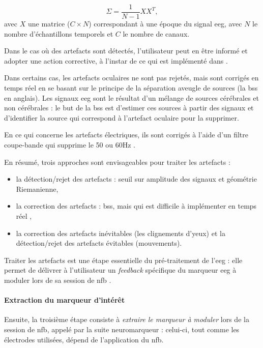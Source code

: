 \begin{equation}
\label{eq:introduction_covariance_matrix}
\Sigma = \frac{1}{N - 1}XX^T,
\end{equation}
avec $X$ une matrice ($C \times N$) correspondant à une époque du signal \gls{eeg}, avec $N$ le nombre d'échantillons temporels et $C$ le nombre de canaux. 

Dans le cas où des artefacts sont détectés, l'utilisateur peut en être informé et adopter une action corrective, à l'instar de ce qui est implémenté dans 
\citet{Bioulac2019}.

Dans certains cas, les artefacts oculaires ne sont pas rejetés, mais sont corrigés en temps réel \citep{Barthelemy2017, Maurizio2014, Bioulac2019} en se basant sur
le principe de la séparation aveugle de sources (la \gls{bss} en anglais). Les signaux \gls{eeg} sont le résultat d'un mélange de sources cérébrales et non cérébrales : le but 
de la \gls{bss} est d'estimer ces sources à partir des signaux et d'identifier la source qui correspond à l'artefact oculaire pour la supprimer.

En ce qui concerne les artefacts électriques, ils sont corrigés à l'aide d'un filtre coupe-bande qui supprime le 50 ou 60Hz \citep{Bioulac2019}.

En résumé, trois approches sont envisageables pour traiter les artefacts :
\begin{itemize}
\item la détection/rejet des artefacts : seuil sur amplitude des signaux et géométrie Riemanienne,
\item la correction des artefacts : \gls{bss}, mais qui est difficile à implémenter en temps réel \citep{Barthelemy2017},
\item la correction des artefacts inévitables (les clignements d'yeux) et la détection/rejet des artefacts évitables (mouvements).
\end{itemize}

Traiter les artefacts est une étape essentielle du pré-traitement de l'\gls{eeg} : elle permet de délivrer à l'utilisateur un \textit{feedback} 
spécifique du marqueur \gls{eeg} à moduler lors de sa session de \gls{nfb} \citep{Barthelemy2019}. 

\paragraph{Extraction du marqueur d'intérêt}
Ensuite, la troisième étape consiste à \emph{extraire le marqueur à moduler} lors de la session de \gls{nfb}, appelé par la suite neuromarqueur : 
celui-ci, tout comme les électrodes utilisées, dépend de l'application du \gls{nfb}. 

